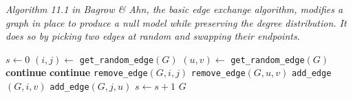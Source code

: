 \documentclass{article}
\begin{document}
\textit{Algorithm 11.1 in Bagrow \& Ahn, the basic edge exchange algorithm, modifies a graph in place to produce a null model while preserving the degree distribution. It does so by picking two edges at random and swapping their endpoints.}

\begin{algorithmic}[1]
    \State $s \gets 0$
        \State $(i, j) \gets$ \texttt{get\_random\_edge}$(G)$
        \State $(u, v) \gets$ \texttt{get\_random\_edge}$(G)$
            \State \textbf{continue}
        \EndIf
            \State \textbf{continue}
        \EndIf
        \State \texttt{remove\_edge}$(G, i, j)$
        \State \texttt{remove\_edge}$(G, u, v)$
        \State \texttt{add\_edge}$(G, i, v)$
        \State \texttt{add\_edge}$(G, j, u)$
        \State $s \gets s + 1$
    \EndWhile
    \State \Return $G$
\EndProcedure
\end{algorithmic}
\end{document}
